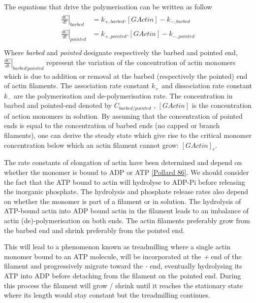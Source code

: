 \documentclass[A4paperpaper,11pt,english]{sphinxmanual}
\begin{document}
The equations that drive the polymerisation can be written as follow
\label{index-latex:equation-roa1}\begin{gather}
\begin{split}\left. \frac{dC}{dt} \right|_{barbed} &= k_{+,{barbed}}.[GActin] - k_{-,{barbed}} \\
\left. \frac{dC}{dt} \right|_{pointed}&= k_{+,{pointed}}.[GActin]- k_{-,{pointed}} \\\end{split}\label{index-latex-roa1}
\end{gather}
Where \emph{barbed} and \emph{pointed} designate respectively the barbed and pointed end,
\(\left.\frac{dC}{dt} \right|_{barbed|pointed}\) represent the variation of
the concentration of actin monomers  which is due to addition or removal at the
barbed (respectively the pointed) end of actin filaments.  The association
rate constant \(k_+\) and dissociation rate constant \(k_-\) are the
polymerisation and de-polymerisation rate.  The concentration in barbed and
pointed-end denoted by \(C_{{barbed}/{pointed}}\) , \([GActin]\) is the
concentration of action monomers in solution. By assuming that the
concentration of pointed ends is equal to the concentration of barbed ends (no
capped or branch filaments), one can derive the steady state which give rise to
the critical monomer concentration below which an actin filament cannot grow:
\([GActin]_c\).

The rate constants of elongation of actin have been determined and depend on
whether the monomer is bound to ADP or ATP {\hyperref[index-latex:pollard1986]{{[}Pollard 86{]}}}. We should
consider the fact that the  ATP bound to actin will hydrolyse to ADP-Pi before releasing
the inorganic phosphate. The hydrolysis and phosphate release rates also depend on whether the
monomer is part of a filament or in solution. The hydrolysis of ATP-bound
actin into ADP bound actin in the filament  leads to an imbalance of actin
(de)-polymerisation on both ends. The actin filaments preferably
grow from the barbed end and shrink preferably from the pointed end.

This will lead to a phenomenon known as treadmilling where a single actin
monomer bound to an ATP molecule, will be incorporated at the \emph{+} end of the
filament and progressively migrate toward the \emph{-} end, eventually hydrolysing its
ATP into ADP before detaching from the filament on the pointed end. During this
process the filament will grow / shrink until it reaches the stationary state
where its length would stay constant but the treadmilling continues.
\end{document}
